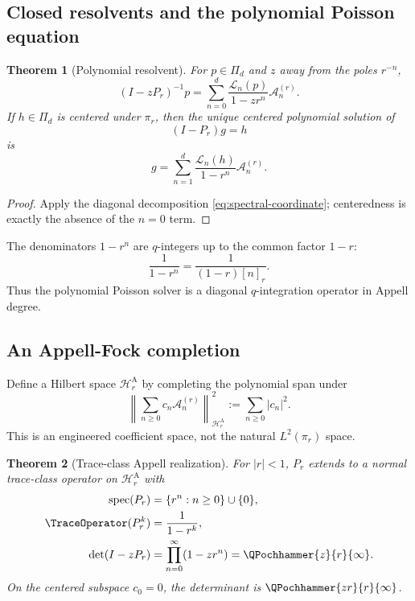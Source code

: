 \documentclass[11pt,a4paper]{article}
\newtheorem{theorem}{Theorem}[section]
\theoremstyle{definition}
\theoremstyle{remark}
\newcommand{\Acal}{\mathcal A}
\newcommand{\Lcal}{\mathcal L}
\newcommand{\Hcal}{\mathcal H}
\begin{document}
\subsection{Closed resolvents and the polynomial Poisson equation}

\begin{theorem}[Polynomial resolvent]
\label{thm:polynomial-resolvent}
For $p\in\Pi_d$ and $z$ away from the poles $r^{-n}$,
\begin{equation}
 (I-zP_r)^{-1}p
 =\sum_{n=0}^{d}\frac{\Lcal_n(p)}{1-zr^n}\Acal_n^{(r)}.
 \label{eq:poly-resolvent}
\end{equation}
If $h\in\Pi_d$ is centered under $\pi_r$, then the unique centered polynomial solution of
\begin{equation}
 (I-P_r)g=h
 \label{eq:Poisson}
\end{equation}
is
\begin{equation}
 \boxed{\displaystyle
 g=\sum_{n=1}^{d}\frac{\Lcal_n(h)}{1-r^n}\Acal_n^{(r)}.}
 \label{eq:poly-Poisson}
\end{equation}
\end{theorem}

\begin{proof}
Apply the diagonal decomposition \eqref{eq:spectral-coordinate}; centeredness is exactly the absence of the $n=0$ term.
\end{proof}

The denominators $1-r^n$ are $q$-integers up to the common factor $1-r$:
\[
 \frac1{1-r^n}=\frac1{(1-r)[n]_r}.
\]
Thus the polynomial Poisson solver is a diagonal $q$-integration operator in Appell degree.

\subsection{An Appell-Fock completion}

Define a Hilbert space $\Hcal_r^{\mathrm A}$ by completing the polynomial span under
\begin{equation}
 \left\|\sum_{n\ge0}c_n\Acal_n^{(r)}\right\|_{\Hcal_r^{\mathrm A}}^2
 :=\sum_{n\ge0}|c_n|^2.
 \label{eq:Fock-norm}
\end{equation}
This is an engineered coefficient space, not the natural $L^2(\pi_r)$ space.

\begin{theorem}[Trace-class Appell realization]
\label{thm:Fock-determinant}
For $|r|<1$, $P_r$ extends to a normal trace-class operator on $\Hcal_r^{\mathrm A}$ with
\begin{align}
 \operatorname{spec}(P_r)&=\{r^n:n\ge0\}\cup\{0\},
 \label{eq:Fock-spectrum}\\
 \TraceOperator(P_r^k)&=\frac1{1-r^k},
 \label{eq:Fock-trace}\\
 \det(I-zP_r)&=\prod_{n=0}^{\infty}(1-zr^n)
 =\QPochhammer{z}{r}{\infty}.
 \label{eq:Fock-det}
\end{align}
On the centered subspace $c_0=0$, the determinant is $\QPochhammer{zr}{r}{\infty}$.
\end{theorem}
\end{document}
